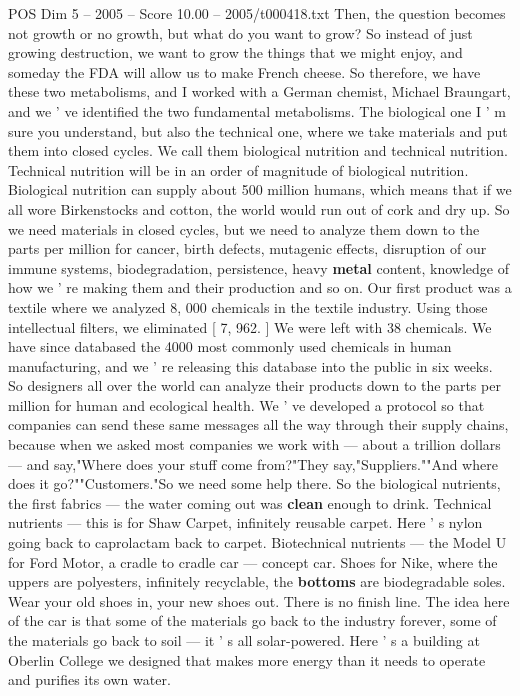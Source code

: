 \begin{textsample}{POS Dim 5 – 2005 – Score 10.00 – 2005/t000418.txt}
Then, the question becomes not growth or no growth, but what do you want to grow?
So instead of just growing destruction, we want to grow the things that we might enjoy, and someday the FDA will allow us to make French cheese.
So therefore, we have these two metabolisms, and I worked with a German chemist, Michael Braungart, and we ' ve identified the two fundamental metabolisms.
The biological one I ' m sure you understand, but also the technical one, where we take materials and put them into closed cycles.
We call them biological nutrition and technical nutrition.
Technical nutrition will be in an order of magnitude of biological nutrition.
Biological nutrition can supply about 500 million humans, which means that if we all wore Birkenstocks and cotton, the world would run out of cork and dry up.
So we need materials in closed cycles, but we need to analyze them down to the parts per million for cancer, birth defects, mutagenic effects, disruption of our immune systems, biodegradation, persistence, heavy \textbf{metal} content, knowledge of how we ' re making them and their production and so on.
Our first product was a textile where we analyzed 8, 000 chemicals in the textile industry.
Using those intellectual filters, we eliminated [ 7, 962. ] We were left with 38 chemicals.
We have since databased the 4000 most commonly used chemicals in human manufacturing, and we ' re releasing this database into the public in six weeks.
So designers all over the world can analyze their products down to the parts per million for human and ecological health.
We ' ve developed a protocol so that companies can send these same messages all the way through their supply chains, because when we asked most companies we work with — about a trillion dollars — and say,"Where does your stuff come from?"They say,"Suppliers.""And where does it go?""Customers."So we need some help there.
So the biological nutrients, the first fabrics — the water coming out was \textbf{clean} enough to drink.
Technical nutrients — this is for Shaw Carpet, infinitely reusable carpet.
Here ' s nylon going back to caprolactam back to carpet.
Biotechnical nutrients — the Model U for Ford Motor, a cradle to cradle car — concept car.
Shoes for Nike, where the uppers are polyesters, infinitely recyclable, the \textbf{bottoms} are biodegradable soles.
Wear your old shoes in, your new shoes out.
There is no finish line.
The idea here of the car is that some of the materials go back to the industry forever, some of the materials go back to soil — it ' s all solar-powered.
Here ' s a building at Oberlin College we designed that makes more energy than it needs to operate and purifies its own water.

\end{textsample}
